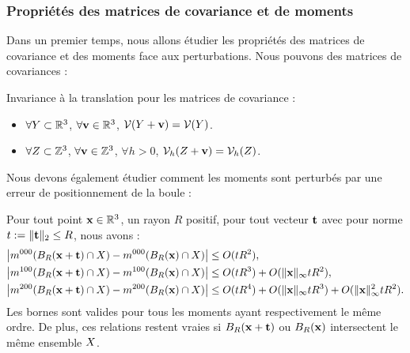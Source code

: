 \subsubsection{Propriétés des matrices de covariance et de moments}
%
Dans un premier temps, nous allons étudier les propriétés des matrices de
covariance et des moments face aux perturbations. Nous pouvons
 des matrices de covariances :
%
\begin{lemma} \label{lem:covariance-translation-invariant}
%
  Invariance à la translation pour les matrices de covariance :
%
  \begin{itemize}
    \item $\forall Y \subset \mathbb{R}^3$, $\forall \mathbf{v} \in \mathbb{R}^3$, $\mathcal{V}(Y + \mathbf{v}) = \mathcal{V}(Y)$.
    \item $\forall Z \subset \mathbb{Z}^3$, $\forall \mathbf{v} \in \mathbb{Z}^3$, $\forall h > 0$, $\mathcal{V}_{h}(Z + \mathbf{v}) = \mathcal{V}_{h}(Z)$.
  \end{itemize}
%
\end{lemma}
%
Nous devons également étudier comment les moments sont perturbés par une erreur de positionnement de la boule :
%
\begin{lemma} \label{lem:moments-ball-position-error}
%
  Pour tout point $\mathbf{x} \in \mathbb{R}^3$, un rayon $R$
  positif, pour tout vecteur $\mathbf{t}$ avec pour norme $t := \| \mathbf{t} \|_2 \le R$,
  nous avons :
%
  \begin{align}
    \left| m^{000}(B_{R}(\mathbf{x} + \mathbf{t}) \cap X) - m^{000}(B_{R}(\mathbf{x}) \cap X) \right|
    & \le O(t R^2), \label{eq:zero-moments-ball-position-error} \\
    \left| m^{100}(B_{R}(\mathbf{x} + \mathbf{t}) \cap X) - m^{100}(B_{R}(\mathbf{x}) \cap X) \right|
    & \le O(t R^3) + O( \|\mathbf{x}\|_\infty t R^2 ), \label{eq:first-moments-ball-position-error}\\
    \left| m^{200}(B_{R}(\mathbf{x} + \mathbf{t}) \cap X) - m^{200}(B_{R}(\mathbf{x}) \cap X) \right|
    & \le O(t R^4) + O( \|\mathbf{x}\|_\infty t R^3 ) + O( \|\mathbf{x}\|^2_\infty t R^2 ). \label{eq:second-moments-ball-position-error}
  \end{align}
%
  Les bornes sont valides pour tous les moments ayant respectivement le même
  ordre. De plus, ces relations restent vraies si $B_{R}(\mathbf{x}+\mathbf{t})$ ou
  $B_{R}(\mathbf{x})$ intersectent le même ensemble $X$.
%
\end{lemma}
